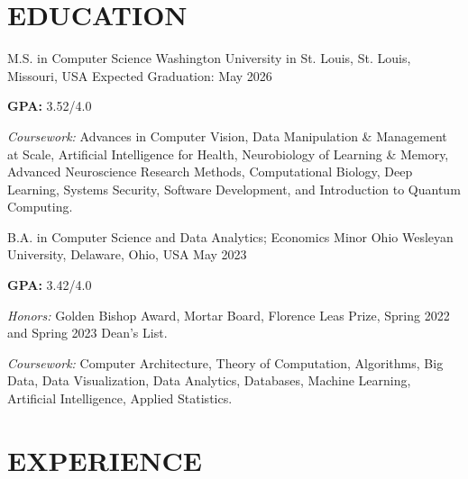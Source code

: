 \documentclass[10pt, letterpaper]{article}
\begin{document}
\section{EDUCATION}

\vspace{\entrySpacing}
\begin{educationentry}
  {M.S. in Computer Science} %
  {Washington University in St. Louis, St. Louis, Missouri, USA} %
  {Expected Graduation: May 2026} %
  \item \textbf{GPA:} 3.52/4.0
  \item \textit{Coursework:} Advances in Computer Vision, Data Manipulation \& Management at Scale, Artificial Intelligence for Health, Neurobiology of Learning \& Memory, Advanced Neuroscience Research Methods, Computational Biology, Deep Learning, Systems Security, Software Development, and Introduction to Quantum Computing.
\end{educationentry}

\vspace{\entrySpacing}
\begin{educationentry}
  {B.A. in Computer Science and Data Analytics; Economics Minor} %
  {Ohio Wesleyan University, Delaware, Ohio, USA} %
  {May 2023} %
  \item \textbf{GPA:} 3.42/4.0
  \item \textit{Honors:} Golden Bishop Award, Mortar Board, Florence Leas Prize, Spring 2022 and Spring 2023 Dean's List.
  \item \textit{Coursework:} Computer Architecture, Theory of Computation, Algorithms, Big Data, Data Visualization, Data Analytics, Databases, Machine Learning, Artificial Intelligence, Applied Statistics.
\end{educationentry}

\vspace{\headerSpacing}

\section{EXPERIENCE}
\end{document}
